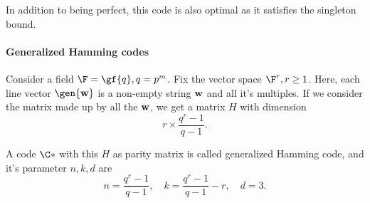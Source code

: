\documentclass{subfiles}
\begin{document}
    In addition to being perfect, this code is also optimal as it satisfies the 
        singleton bound.

    \paragraph*{Generalized Hamming codes}
    Consider a field \(\F = \gf{q}, q = p^{m}\). Fix the vector space \(\F^{r}, r \ge 1\). 
    Here, each line vector \(\gen{\bv{w}}\) is a non-empty string \(\mathbf{w}\) and all it's multiples.
    If we consider the matrix made up by all the \(\mathbf{w}\), we get a matrix \(H\) with dimension 
    \[
        r \times \frac{q^{r} - 1}{q - 1}.
    \]

    A code \(\C*\) with this \(H\) as parity matrix is called generalized Hamming code, 
        and it's parameter \(n, k, d\) are 
        \[
            n = \frac{q^{r} - 1}{q - 1}, \quad k = \frac{q^{r} - 1}{q - 1} - r, \quad d = 3.
        \]
\end{document}
